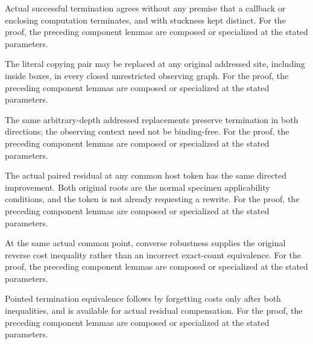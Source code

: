 Actual successful termination agrees without any premise that a callback or enclosing computation terminates, and with stuckness kept distinct.
For the proof, the preceding component lemmas are composed or specialized at the stated parameters.
\par{}

The literal copying pair may be replaced at any original addressed site, including inside boxes, in every closed unrestricted observing graph.
For the proof, the preceding component lemmas are composed or specialized at the stated parameters.
\par{}

The same arbitrary-depth addressed replacements preserve termination in both directions; the observing context need not be binding-free.
For the proof, the preceding component lemmas are composed or specialized at the stated parameters.
\par{}

The actual paired residual at any common host token has the same directed improvement. Both original roots are the normal specimen applicability conditions, and the token is not already requesting a rewrite.
For the proof, the preceding component lemmas are composed or specialized at the stated parameters.
\par{}

At the same actual common point, converse robustness supplies the original reverse cost inequality rather than an incorrect exact-count equivalence.
For the proof, the preceding component lemmas are composed or specialized at the stated parameters.
\par{}

Pointed termination equivalence follows by forgetting costs only after both inequalities, and is available for actual residual compensation.
For the proof, the preceding component lemmas are composed or specialized at the stated parameters.
\par{}


